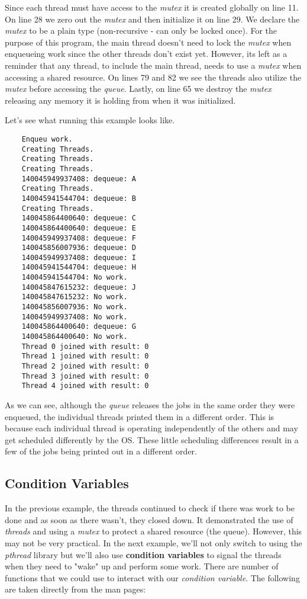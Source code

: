 \documentclass[../main.tex]{subfiles}
\begin{document}
	Since each thread must have access to the \textit{mutex} it is created globally on line 11.  On line 28 we zero out the \textit{mutex} and then initialize it on line 29.  We declare the \textit{mutex} to be a plain type (non-recursive - can only be locked once).  For the purpose of this program, the main thread doesn't need to lock the \textit{mutex} when enqueueing work since the other threads don't exist yet.  However, its left as a reminder that any thread, to include the main thread, needs to use a \textit{mutex} when accessing a shared resource.  On lines 79 and 82 we see the threads also utilize the \textit{mutex} before accessing the \textit{queue}.  Lastly, on line 65 we destroy the \textit{mutex} releasing any memory it is holding from when it was initialized.
	
	Let's see what running this example looks like.
	
	\begin{verbatim}
	Enqueu work.
	Creating Threads.
	Creating Threads.
	Creating Threads.
	140045949937408: dequeue: A
	Creating Threads.
	140045941544704: dequeue: B
	Creating Threads.
	140045864400640: dequeue: C
	140045864400640: dequeue: E
	140045949937408: dequeue: F
	140045856007936: dequeue: D
	140045949937408: dequeue: I
	140045941544704: dequeue: H
	140045941544704: No work.
	140045847615232: dequeue: J
	140045847615232: No work.
	140045856007936: No work.
	140045949937408: No work.
	140045864400640: dequeue: G
	140045864400640: No work.
	Thread 0 joined with result: 0
	Thread 1 joined with result: 0
	Thread 2 joined with result: 0
	Thread 3 joined with result: 0
	Thread 4 joined with result: 0
	\end{verbatim}
	
	As we can see, although the \textit{queue} releases the jobs in the same order they were enqueued, the individual threads printed them in a different order.  This is because each individual thread is operating independently of the others and may get scheduled differently by the OS.  These little scheduling differences result in a few of the jobs being printed out in a different order.
	
	\subsection{Condition Variables}
	
	In the previous example, the threads continued to check if there was work to be done and as soon as there wasn't, they closed down.  It demonstrated the use of \textit{threads} and using a \textit{mutex} to protect a shared resource (the queue).  However, this may not be very practical.  In the next example, we'll not only switch to using the \textit{pthread} library but we'll also use \textbf{condition variables} to signal the threads when they need to "wake" up and perform some work.  There are number of functions that we could use to interact with our \textit{condition variable}.  The following are taken directly from the man pages:
	
\end{document}
